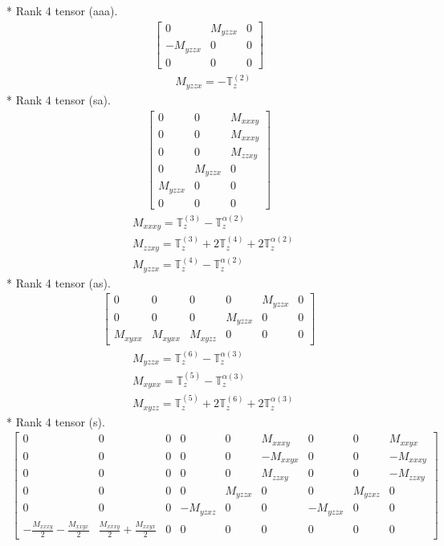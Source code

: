 \documentclass[fleqn,8pt,landscape]{jsarticle}
\begin{document}
* Rank 4 tensor (aaa).
\begin{align*}
\begin{bmatrix} 0 & M_{yzzx} & 0 \\ - M_{yzzx} & 0 & 0 \\ 0 & 0 & 0 \end{bmatrix}
\end{align*}
\begin{align*}
& M_{yzzx} = - \mathbb{T}_{z}^{(2)}
\end{align*}
* Rank 4 tensor (sa).
\begin{align*}
\begin{bmatrix} 0 & 0 & M_{xxxy} \\ 0 & 0 & M_{xxxy} \\ 0 & 0 & M_{zzxy} \\ 0 & M_{yzzx} & 0 \\ M_{yzzx} & 0 & 0 \\ 0 & 0 & 0 \end{bmatrix}
\end{align*}
\begin{align*}
& M_{xxxy} = \mathbb{T}_{z}^{(3)} - \mathbb{T}_{z}^{\alpha(2)} \\
& M_{zzxy} = \mathbb{T}_{z}^{(3)} + 2 \mathbb{T}_{z}^{(4)} + 2 \mathbb{T}_{z}^{\alpha(2)} \\
& M_{yzzx} = \mathbb{T}_{z}^{(4)} - \mathbb{T}_{z}^{\alpha(2)}
\end{align*}
* Rank 4 tensor (as).
\begin{align*}
\begin{bmatrix} 0 & 0 & 0 & 0 & M_{yzzx} & 0 \\ 0 & 0 & 0 & M_{yzzx} & 0 & 0 \\ M_{xyxx} & M_{xyxx} & M_{xyzz} & 0 & 0 & 0 \end{bmatrix}
\end{align*}
\begin{align*}
& M_{yzzx} = \mathbb{T}_{z}^{(6)} - \mathbb{T}_{z}^{\alpha(3)} \\
& M_{xyxx} = \mathbb{T}_{z}^{(5)} - \mathbb{T}_{z}^{\alpha(3)} \\
& M_{xyzz} = \mathbb{T}_{z}^{(5)} + 2 \mathbb{T}_{z}^{(6)} + 2 \mathbb{T}_{z}^{\alpha(3)}
\end{align*}
* Rank 4 tensor (s).
\begin{align*}
\begin{bmatrix} 0 & 0 & 0 & 0 & 0 & M_{xxxy} & 0 & 0 & M_{xxyx} \\ 0 & 0 & 0 & 0 & 0 & - M_{xxyx} & 0 & 0 & - M_{xxxy} \\ 0 & 0 & 0 & 0 & 0 & M_{zzxy} & 0 & 0 & - M_{zzxy} \\ 0 & 0 & 0 & 0 & M_{yzzx} & 0 & 0 & M_{yzxz} & 0 \\ 0 & 0 & 0 & - M_{yzxz} & 0 & 0 & - M_{yzzx} & 0 & 0 \\ - \frac{M_{xxxy}}{2} - \frac{M_{xxyx}}{2} & \frac{M_{xxxy}}{2} + \frac{M_{xxyx}}{2} & 0 & 0 & 0 & 0 & 0 & 0 & 0 \end{bmatrix}
\end{align*}
\end{document}
